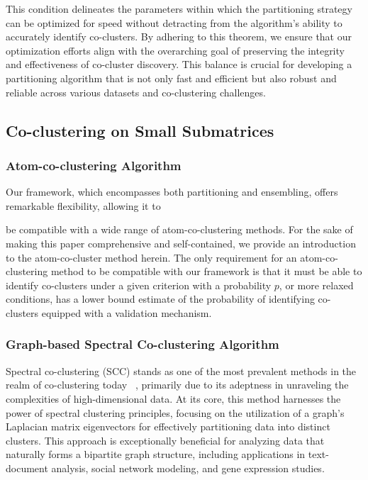 \documentclass[journal]{IEEEtran}
\renewcommand{\cite}[1]{~\autocite{#1}}
\begin{document}
This condition delineates the parameters within which the partitioning strategy can be optimized for speed without detracting from the algorithm's ability to accurately identify co-clusters. By adhering to this theorem, we ensure that our optimization efforts align with the overarching goal of preserving the integrity and effectiveness of co-cluster discovery. This balance is crucial for developing a partitioning algorithm that is not only fast and efficient but also robust and reliable across various datasets and co-clustering challenges.

\subsection{Co-clustering on Small Submatrices}

\subsubsection{Atom-co-clustering Algorithm}

Our framework, which encompasses both partitioning and ensembling, offers remarkable flexibility, allowing it to

be compatible with a wide range of atom-co-clustering methods. For the sake of making this paper comprehensive and self-contained, we provide an introduction to the atom-co-cluster method herein. The only requirement for an atom-co-clustering method to be compatible with our framework is that it must be able to identify co-clusters under a given criterion with a probability $p$, or more relaxed conditions, has a lower bound estimate of the probability of identifying co-clusters equipped with a validation mechanism.

\subsubsection{Graph-based Spectral Co-clustering Algorithm}

Spectral co-clustering (SCC) stands as one of the most prevalent methods in the realm of co-clustering today \cite{vonluxburg2007TutorialSpectralClustering}, primarily due to its adeptness in unraveling the complexities of high-dimensional data. At its core, this method harnesses the power of spectral clustering principles, focusing on the utilization of a graph's Laplacian matrix eigenvectors for effectively partitioning data into distinct clusters. This approach is exceptionally beneficial for analyzing data that naturally forms a bipartite graph structure, including applications in text-document analysis, social network modeling, and gene expression studies.
\end{document}
